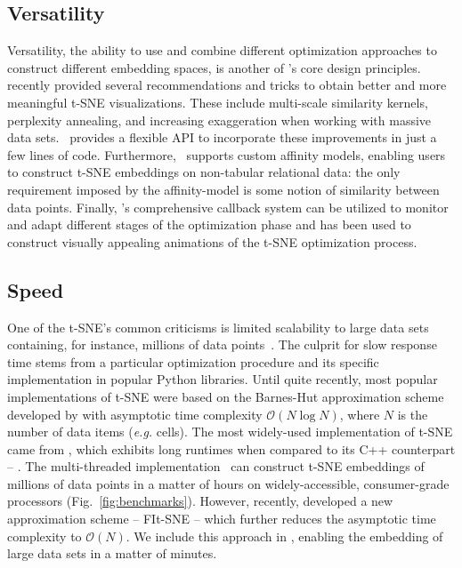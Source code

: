 \documentclass[article]{jss}
\newcommand{\opentsne}{\pkg{openTSNE}}
\begin{document}
\subsection{Versatility}

Versatility, the ability to use and combine different optimization approaches to
construct different embedding spaces, is another of \opentsne's core design
principles. \citet{kobak2019art} recently provided several recommendations and
tricks to obtain better and more meaningful t-SNE visualizations. These include
multi-scale similarity kernels, perplexity annealing, and increasing
exaggeration when working with massive data sets. \opentsne\ provides a flexible
API to incorporate these improvements in just a few lines of code. Furthermore,
\opentsne\ supports custom affinity models, enabling users to construct t-SNE
embeddings on non-tabular relational data: the only requirement imposed by the
affinity-model is some notion of similarity between data points. Finally,
\opentsne's comprehensive callback system can be utilized to monitor and adapt
different stages of the optimization phase and has been used to construct
visually appealing animations of the t-SNE optimization process.

\subsection{Speed}

One of the t-SNE's common criticisms is limited scalability to large data sets
containing, for instance, millions of data
points~\citep{becht2019dimensionality}. The culprit for slow response time stems
from a particular optimization procedure and its specific implementation in
popular Python libraries. Until quite recently, most popular implementations of
t-SNE were based on the Barnes-Hut approximation scheme developed by
\citet{van2014accelerating} with asymptotic time complexity $\mathcal{O}(N \log
N)$, where $N$ is the number of data items ({\em e.g.} cells). The most
widely-used implementation of t-SNE came from , which exhibits
long runtimes when compared to its C++ counterpart -- . The
multi-threaded  implementation~\citep{Ulyanov2016} can
construct t-SNE embeddings of millions of data points in a matter of hours on
widely-accessible, consumer-grade processors (Fig.~\ref{fig:benchmarks}).
However, recently, \citet{linderman2019fast} developed a new approximation
scheme -- FIt-SNE -- which further reduces the asymptotic time complexity to
$\mathcal{O}(N)$. We include this approach in \opentsne, enabling the embedding
of large data sets in a matter of minutes. 
\end{document}
